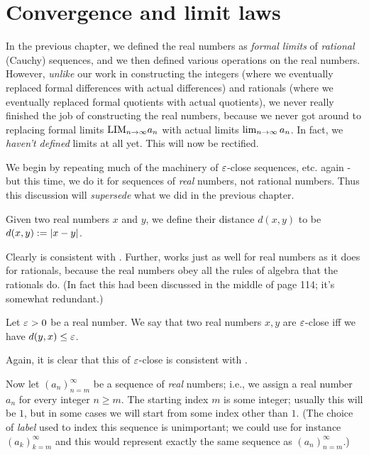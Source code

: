 \section{Convergence and limit laws}

In the previous chapter, we defined the real numbers as \emph{formal limits} of \emph{rational} (Cauchy) sequences, and we then defined various operations on the real numbers.
However, \emph{unlike} our work in constructing the integers (where we eventually replaced formal differences with actual differences) and rationals (where we eventually replaced formal quotients with actual quotients),
we never really finished the job of constructing the real numbers, because we never got around to replacing formal limits \(\text{LIM}_{n \to \infty} a_n\) with actual limits \(\lim_{n \to \infty} a_n\).
In fact, we \emph{haven’t defined} limits at all yet.
This will now be rectified.

We begin by repeating much of the machinery of \(\varepsilon\)-close sequences, etc. again
- but this time, we do it for sequences of \emph{real} numbers, not rational numbers.
Thus this discussion will \emph{supersede} what we did in the previous chapter.

\begin{definition}  \label{def 6.1.1}
Given two real numbers \(x\) and \(y\), we define their distance \(d(x, y)\) to be \(d(x, y):= \lvert x - y\rvert\).
\end{definition}

\begin{note}
Clearly  is consistent with .
Further,  works just as well for real numbers as it does for rationals, because the real numbers obey all the rules of algebra that the rationals do.
(In fact this had been discussed in the middle of page 114; it's somewhat redundant.)
\end{note}

\begin{definition}  \label{def 6.1.2}
Let \(\varepsilon > 0\) be a real number.
We say that two real numbers \(x, y\) are \(\varepsilon\)-close iff we have \(d(y, x) \le \varepsilon\).
\end{definition}

\begin{note}
Again, it is clear that this  of \(\varepsilon\)-close is consistent with .
\end{note}

\begin{note}
Now let \((a_n)_{n = m}^\infty\) be a sequence of \emph{real} numbers;
i.e., we assign a real number \(a_n\) for every integer \(n \geq m\).
The starting index \(m\) is some integer;
usually this will be \(1\), but in some cases we will start from some index other than \(1\).
(The choice of \emph{label} used to index this sequence is unimportant; we could use for instance \((a_k)_{k = m}^{\infty}\) and this would represent exactly the same sequence as \((a_n)_{n = m}^{\infty}\).)
\end{note}

